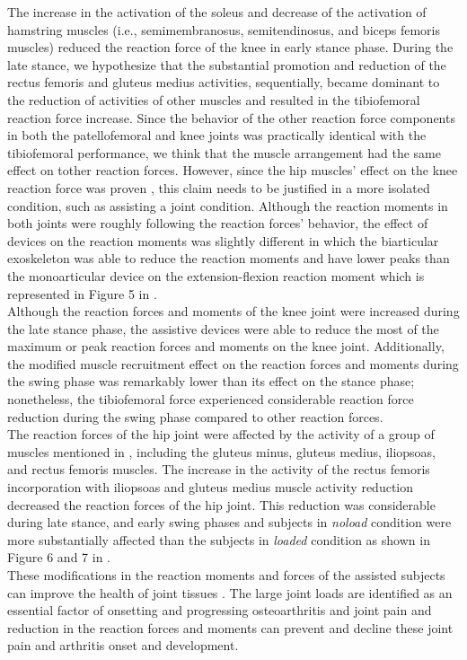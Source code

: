 \documentclass[10pt,letterpaper]{article}
\begin{document}
The increase in the activation of the soleus and decrease of the activation of hamstring muscles (i.e., semimembranosus, semitendinosus, and biceps femoris muscles) reduced the reaction force of the knee in early stance phase. During the late stance, we hypothesize that the substantial promotion and reduction of the rectus femoris and gluteus medius activities, sequentially, became dominant to the reduction of activities of other muscles and resulted in the tibiofemoral reaction force increase. Since the behavior of the other reaction force components in both the patellofemoral and knee joints was practically identical with the tibiofemoral performance, we think that the muscle arrangement had the same effect on tother reaction forces. However, since the hip muscles' effect on the knee reaction force was proven \cite{170,171}, this claim needs to be justified in a more isolated condition, such as assisting a joint condition. Although the reaction moments in both joints were roughly following the reaction forces' behavior, the effect of devices on the reaction moments was slightly different in which the biarticular exoskeleton was able to reduce the reaction moments and have lower peaks than the monoarticular device on the extension-flexion reaction moment which is represented in Figure 5 in .\\
Although the reaction forces and moments of the knee joint were increased during the late stance phase, the assistive devices were able to reduce the most of the maximum or peak reaction forces and moments on the knee joint. Additionally, the modified muscle recruitment effect on the reaction forces and moments during the swing phase was remarkably lower than its effect on the stance phase; nonetheless, the tibiofemoral force experienced considerable reaction force reduction during the swing phase compared to other reaction forces.\\
The reaction forces of the hip joint were affected by the activity of a group of muscles mentioned in \cite{170}, including the gluteus minus, gluteus medius, iliopsoas, and rectus femoris muscles. The increase in the activity of the rectus femoris incorporation with iliopsoas and gluteus medius muscle activity reduction decreased the reaction forces of the hip joint. This reduction was considerable during late stance, and early swing phases and subjects in {\it noload} condition were more substantially affected than the subjects in {\it loaded} condition as shown in Figure 6 and 7 in . \\
These modifications in the reaction moments and forces of the assisted subjects can improve the health of joint tissues \cite{178}. The large joint loads are identified as an essential factor of onsetting and progressing osteoarthritis \cite{172,176,177} and joint pain \cite{175} and reduction in the reaction forces and moments can prevent and decline these joint pain and arthritis onset and development.
\end{document}
